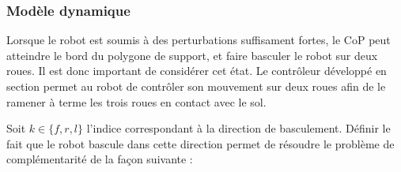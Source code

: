 			\subsubsection{Modèle dynamique}
			
				Lorsque le robot est soumis à des perturbations suffisament fortes, le CoP peut atteindre le bord du polygone de support, et faire basculer le robot sur deux roues.
				Il est donc important de considérer cet état. 
				Le contrôleur développé en section  permet au robot de contrôler son mouvement sur deux roues afin de le ramener à terme les trois roues en contact avec le sol.
				
				Soit $k\in\{f,r,l\}$ l'indice correspondant à la direction de basculement. 
				Définir le fait que le robot bascule dans cette direction  permet de résoudre le problème de complémentarité de la façon suivante :
				
